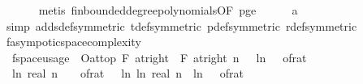 \begin{isabellebody}
\ \ \ \ \ \isamarkupfalse%
\ {\isacharparenleft}{\kern0pt}metis\ fin{\isacharunderscore}{\kern0pt}bounded{\isacharunderscore}{\kern0pt}degree{\isacharunderscore}{\kern0pt}polynomials{\isacharbrackleft}{\kern0pt}OF\ p{\isacharunderscore}{\kern0pt}ge{\isacharunderscore}{\kern0pt}{}{\isacharbrackright}{\kern0pt}{\isacharparenright}{\kern0pt}\isanewline
\ \ \ \ \isamarkupfalse%
\ a\isanewline
\ \ \ \ \isamarkupfalse%
\ {\isacharparenleft}{\kern0pt}simp\ add{\isacharcolon}{\kern0pt}s{\isacharunderscore}{\kern0pt}def{\isacharbrackleft}{\kern0pt}symmetric{\isacharbrackright}{\kern0pt}\ t{\isacharunderscore}{\kern0pt}def{\isacharbrackleft}{\kern0pt}symmetric{\isacharbrackright}{\kern0pt}\ p{\isacharunderscore}{\kern0pt}def{\isacharbrackleft}{\kern0pt}symmetric{\isacharbrackright}{\kern0pt}\ r{\isacharunderscore}{\kern0pt}def{\isacharbrackleft}{\kern0pt}symmetric{\isacharbrackright}{\kern0pt}{\isacharparenright}{\kern0pt}\isanewline
{}\isamarkupfalse%
%
\endisatagproof
{\isafoldproof}%
%
\isadelimproof
\isanewline
%
\endisadelimproof
\isanewline
{}\isamarkupfalse%
\ f{}{\isacharunderscore}{\kern0pt}asympotic{\isacharunderscore}{\kern0pt}space{\isacharunderscore}{\kern0pt}complexity{\isacharcolon}{\kern0pt}\isanewline
\ \ {\isachardoublequoteopen}f{}{\isacharunderscore}{\kern0pt}space{\isacharunderscore}{\kern0pt}usage\ {\isasymin}\ O{\isacharbrackleft}{\kern0pt}at{\isacharunderscore}{\kern0pt}top\ {\isasymtimes}\isactrlsub F\ at{\isacharunderscore}{\kern0pt}right\ {}\ {\isasymtimes}\isactrlsub F\ at{\isacharunderscore}{\kern0pt}right\ {}{\isacharbrackright}{\kern0pt}{\isacharparenleft}{\kern0pt}{\isasymlambda}{\isacharparenleft}{\kern0pt}n{\isacharcomma}{\kern0pt}\ {\isasymepsilon}{\isacharcomma}{\kern0pt}\ {\isasymdelta}{\isacharparenright}{\kern0pt}{\isachardot}{\kern0pt}\ ln\ {\isacharparenleft}{\kern0pt}{}\ {\isacharslash}{\kern0pt}\ of{\isacharunderscore}{\kern0pt}rat\ {\isasymepsilon}{\isacharparenright}{\kern0pt}\ {\isacharasterisk}{\kern0pt}\ \isanewline
\ \ {\isacharparenleft}{\kern0pt}ln\ {\isacharparenleft}{\kern0pt}real\ n{\isacharparenright}{\kern0pt}\ {\isacharplus}{\kern0pt}\ {}\ {\isacharslash}{\kern0pt}\ {\isacharparenleft}{\kern0pt}of{\isacharunderscore}{\kern0pt}rat\ {\isasymdelta}{\isacharparenright}{\kern0pt}\ {\isacharasterisk}{\kern0pt}\ {\isacharparenleft}{\kern0pt}ln\ {\isacharparenleft}{\kern0pt}ln\ {\isacharparenleft}{\kern0pt}real\ n{\isacharparenright}{\kern0pt}{\isacharparenright}{\kern0pt}\ {\isacharplus}{\kern0pt}\ ln\ {\isacharparenleft}{\kern0pt}{}\ {\isacharslash}{\kern0pt}\ of{\isacharunderscore}{\kern0pt}rat\ {\isasymdelta}{\isacharparenright}{\kern0pt}{\isacharparenright}{\kern0pt}{\isacharparenright}{\kern0pt}{\isacharparenright}{\kern0pt}{\isachardoublequoteclose}\isanewline

\end{isabellebody}
